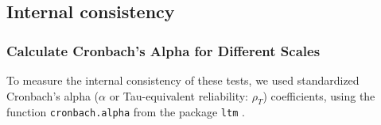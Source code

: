 \documentclass[
  bookmarksnumbered]{article}
\begin{document}
\subsection{Internal consistency}\label{internal-consistency}

\subsubsection{Calculate Cronbach's Alpha for Different Scales}\label{calculate-cronbachs-alpha-for-different-scales}

To measure the internal consistency of these tests, we used standardized Cronbach's alpha (\(\alpha\) or Tau-equivalent reliability: \(\rho_{T}\)) coefficients, using the function \texttt{cronbach.alpha} from the package \texttt{ltm} \autocite{LtmPackageLatent2006}.
\end{document}
